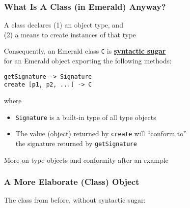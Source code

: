 \begin{frame}[fragile]

\frametitle{What Is A Class (in Emerald) Anyway?}

\begin{center}

A class declares (1) an object type, and \\ (2) a means to create
instances of that type

\end{center}

\vspace{\fill}

Consequently, an Emerald class \texttt{C} is
\textbf{\underline{syntactic sugar}}\\ for an Emerald object exporting
the following methods:

\begin{lstlisting}
getSignature -> Signature
create [p1, p2, ...] -> C
\end{lstlisting}

where

\begin{itemize}

\item \lstinline{Signature} is a built-in type of all type objects

\item The value (object) returned by \texttt{create} will ``conform
to''\\ the signature returned by \texttt{getSignature}

\end{itemize}

More on type objects and conformity after an example

\end{frame}

\begin{frame}[fragile]

\frametitle{A More Elaborate (Class) Object}

The class from before, without syntactic sugar:


\end{frame}
